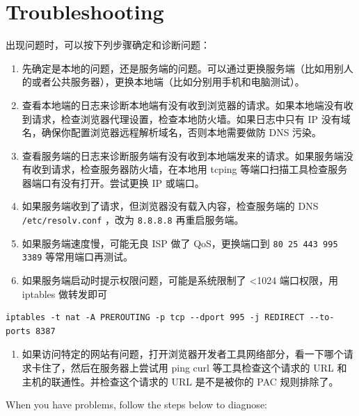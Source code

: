 \documentclass[11pt,a4paper]{sphinxmanual}
\begin{document}
\section{Troubleshooting}
\label{sec-7-1}
出现问题时，可以按下列步骤确定和诊断问题：

\begin{enumerate}
\item 先确定是本地的问题，还是服务端的问题。可以通过更换服务端（比如用别人的或者公共服务器），更换本地端（比如分别用手机和电脑测试）。
\item 查看本地端的日志来诊断本地端有没有收到浏览器的请求。如果本地端没有收到请求，检查浏览器代理设置，检查本地防火墙。如果日志中只有 IP 没有域名，确保你配置浏览器远程解析域名，否则本地需要做防 DNS 污染。
\item 查看服务端的日志来诊断服务端有没有收到本地端发来的请求。如果服务端没有收到请求，检查服务器防火墙，在本地用 tcping 等端口扫描工具检查服务器端口有没有打开。尝试更换 IP 或端口。
\item 如果服务端收到了请求，但浏览器没有载入内容，检查服务端的 DNS \verb~/etc/resolv.conf~ ，改为 \verb~8.8.8.8~ 再重启服务端。
\item 如果服务端速度慢，可能无良 ISP 做了 QoS，更换端口到 \verb~80 25 443 995 3389~ 等常用端口再测试。
\item 如果服务端启动时提示权限问题，可能是系统限制了 <1024 端口权限，用 iptables 做转发即可
\end{enumerate}
\begin{Verbatim}
iptables -t nat -A PREROUTING -p tcp --dport 995 -j REDIRECT --to-ports 8387
\end{Verbatim}
\begin{enumerate}
\item 如果访问特定的网站有问题，打开浏览器开发者工具网络部分，看一下哪个请求卡住了，然后在服务器上尝试用 ping curl 等工具检查这个请求的 URL 和主机的联通性。并检查这个请求的 URL 是不是被你的 PAC 规则排除了。
\end{enumerate}

When you have problems, follow the steps below to diagnose:
\end{document}
